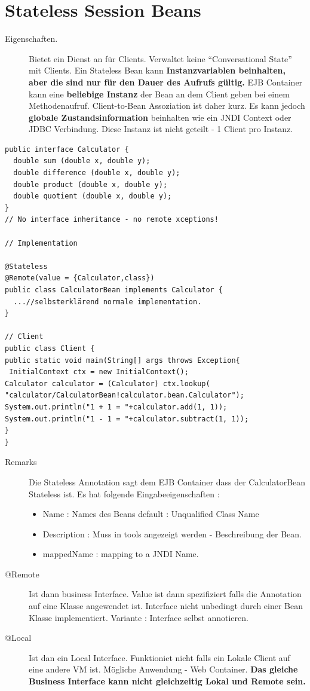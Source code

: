 \documentclass[a4paper,10pt]{scrreprt}
\begin{document}
\section{Stateless Session Beans}
\begin{description}
 \item [Eigenschaften.] Bietet ein Dienst an für Clients. Verwaltet keine ``Conversational State'' mit Clients. Ein Stateless Bean kann \textbf{Instanzvariablen beinhalten, aber die sind nur für den Dauer des Aufrufs gültig.} EJB Container kann eine \textbf{beliebige Instanz} der Bean an dem Client geben bei einem Methodenaufruf. Client-to-Bean Assoziation ist daher kurz. Es kann jedoch \textbf{globale Zustandsinformation} beinhalten wie ein JNDI Context oder JDBC Verbindung. Diese Instanz ist nicht geteilt - 1 Client pro Instanz.
\end{description}
\begin{lstlisting}[caption=Calculator Example Stateless Bean]
public interface Calculator {
  double sum (double x, double y);
  double difference (double x, double y);
  double product (double x, double y);
  double quotient (double x, double y);
}
// No interface inheritance - no remote xceptions!

// Implementation

@Stateless
@Remote(value = {Calculator,class})
public class CalculatorBean implements Calculator {
  ...//selbsterklärend normale implementation.
}

// Client
public class Client {
public static void main(String[] args throws Exception{
 InitialContext ctx = new InitialContext();
Calculator calculator = (Calculator) ctx.lookup(
"calculator/CalculatorBean!calculator.bean.Calculator");
System.out.println("1 + 1 = "+calculator.add(1, 1));
System.out.println("1 - 1 = "+calculator.subtract(1, 1));
}
}
\end{lstlisting}
\begin{description}
 \item [Remarks] Die Stateless Annotation sagt dem EJB Container dass der CalculatorBean Stateless ist. Es hat folgende Eingabeeigenschaften : 
 \begin{itemize}
  \item Name : Names des Beans default : Unqualified Class Name
  \item Description : Muss in tools angezeigt werden - Beschreibung der Bean.
  \item mappedName : mapping to a JNDI Name. 
 \end{itemize}
 \item[@Remote] Ist dann business Interface. Value ist dann spezifiziert falls die Annotation auf eine Klasse angewendet ist. Interface nicht unbedingt durch einer Bean Klasse implementiert. Variante : Interface selbst annotieren.
 \item[@Local] Ist dan ein Local Interface. Funktioniet nicht falls ein Lokale Client auf eine andere VM ist. Mögliche Anwendung - Web Container. \textbf{Das gleiche Business Interface kann nicht gleichzeitig Lokal und Remote sein.}
\end{description}
\end{document}
